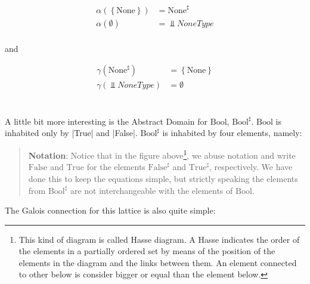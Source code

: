 \null\hfill
  \begin{minipage}{.35\textwidth}
  \[\begin{array}{rl}
    \alpha\left(\left\{\text{None}\right\}\right) &= \text{None}^{\sharp} \\
    \alpha\left(\emptyset\right) &= \Bot{NoneType} \\
  \end{array}\]
  \end{minipage}
  and
  \begin{minipage}{.35\textwidth}
  \[\begin{array}{rl}
    \gamma\left(\text{None}^\sharp\right) &= \left\{\text{None}\right\} \\
    \gamma\left(\Bot{NoneType}\right) &= \emptyset \\
  \end{array}\]
  \end{minipage}
\hfill\null
\\[.5em]

A little bit more interesting is the Abstract Domain for \(\text{Bool}\), \(\text{Bool}^\sharp\).
\(\text{Bool}\) is inhabited only by \pycode|True| and \pycode|False|.
\(\text{Bool}^\sharp\) is inhabited by four elements, namely:

\begin{center}

\end{center}


\begin{quote}
 \textbf{Notation}: Notice that in the figure above\footnote{%
   This kind of diagram is called Hasse diagram. A Hasse indicates the order of the
   elements in a partially ordered set by means of the position of the elements in the
   diagram and the links between them. An element connected to other below is consider
   bigger or equal than the element below.
 }, we abuse notation and write \(\text{False}\) and \(\text{True}\) for the elements
 \(\text{False}^\sharp\) and \(\text{True}^\sharp\), respectively. We have done this to
 keep the equations simple, but strictly speaking the elements from \(\text{Bool}^\sharp\)
 are not interchangeable with the elements of \(\text{Bool}\).
\end{quote}

The Galois connection for this lattice is also quite simple:

